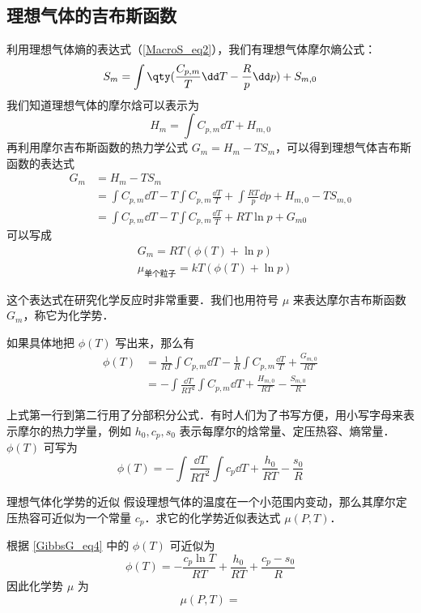 \subsection{理想气体的吉布斯函数}
利用理想气体熵的表达式（\autoref{MacroS_eq2}），我们有理想气体摩尔熵公式：
\begin{equation}
S_m=\int \qty(\frac{C_{p,m}}{T}\dd T-\frac{R}{p}\dd p)+S_{m,0}
\end{equation}
我们知道理想气体的摩尔焓可以表示为
\begin{equation}
H_m=\int C_{p,m}\dd T+H_{m,0}
\end{equation}
再利用摩尔吉布斯函数的热力学公式 $G_m=H_m-TS_m$，可以得到理想气体吉布斯函数的表达式
\begin{equation}
\begin{aligned}
G_m&=H_m-TS_m\\
&=\int C_{p,m} \dd T - T\int C_{p,m} \frac{\dd T}{T}+\int \frac{RT}{p}\dd p +H_{m,0}-TS_{m,0}
\\
&=\int C_{p,m} \dd T - T\int C_{p,m} \frac{\dd T}{T}+RT\ln p+G_{m0}
\end{aligned}
\end{equation}
可以写成
\begin{equation}\label{GibbsG_eq3}
\begin{aligned}
&G_m=RT(\phi(T)+\ln p)\\
&\mu_{\text{单个粒子}} = kT(\phi(T)+\ln p)
\end{aligned}
\end{equation}

这个表达式在研究化学反应时非常重要．我们也用符号 $\mu$ 来表达摩尔吉布斯函数 $G_m$，称它为化学势．

如果具体地把 $\phi(T)$ 写出来，那么有
\begin{equation}
\begin{aligned}
\phi(T)&=\frac{1}{RT}\int C_{p,m}\dd T-\frac{1}{R}\int C_{p,m}\frac{\dd T}{T}+\frac{G_{m,0}}{RT}\\
&=-\int \frac{\dd T}{RT^2}\int C_{p,m}\dd T+\frac{H_{m,0}}{RT}-\frac{S_{m,0}}{R}
\end{aligned}
\end{equation}

上式第一行到第二行用了分部积分公式．有时人们为了书写方便，用小写字母来表示摩尔的热力学量，例如 $h_0,c_p,s_0$ 表示每摩尔的焓常量、定压热容、熵常量．$\phi(T)$ 可写为
\begin{equation}\label{GibbsG_eq4}
\phi(T)=-\int\frac{\dd T}{RT^2}\int c_{p}\dd T+\frac{h_{0}}{RT}-\frac{s_{0}}{R}
\end{equation}

\begin{example}{理想气体化学势的近似}
假设理想气体的温度在一个小范围内变动，那么其摩尔定压热容可近似为一个常量 $c_p$．求它的化学势近似表达式 $\mu(P,T)$．

根据 \autoref{GibbsG_eq4} 中的 $\phi(T)$ 可近似为
\begin{equation}
\phi(T)=-\frac{c_p\ln T}{RT}+\frac{h_0}{RT}+\frac{c_p-s_0}{R}
\end{equation}
因此化学势 $\mu$ 为
\begin{equation}
\mu(P,T)=
\end{equation}

\end{example}
